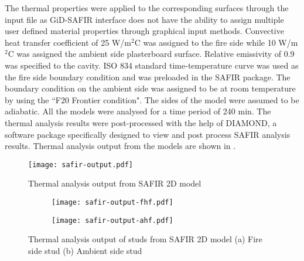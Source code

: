 The thermal properties were applied to the corresponding surfaces through the input file as GiD-SAFIR interface does not have the ability to assign multiple user defined material properties through graphical input methods. Convective heat transfer coefficient of 25 W/m$^2$\degree C was assigned to the fire side while 10 W/m$^2$\degree C was assigned the ambient side plasterboard surface. Relative emissivity of 0.9 was specified to the cavity. ISO 834 standard time-temperature curve was used as the fire side boundary condition and was preloaded in the SAFIR package. The boundary condition on the ambient side was assigned to be at room temperature by using the ``F20 Frontier condition". The sides of the model were assumed to be adiabatic. All the models were analysed for a time period of 240 min. The thermal analysis results were post-processed with the help of DIAMOND, a software package specifically designed to view and post process SAFIR analysis results. Thermal analysis output from the models are shown in .
\begin{figure}[!htbp]
	\centering
	\texttt{[image: safir-output.pdf]}
	\caption{Thermal analysis output from SAFIR 2D model}
	\label{fig:safir-output}
\end{figure}
\begin{figure}[!htbp]
	\centering
	\begin{subfigure}[b]{0.4\textwidth}
		\centering
		\texttt{[image: safir-output-fhf.pdf]}
		\caption{}
		\label{subfig:safir-output-fhf}
	\end{subfigure}
	\begin{subfigure}[b]{0.4\textwidth}
		\centering
		\texttt{[image: safir-output-ahf.pdf]}
		\caption{}
		\label{subfig:safir-output-ahf}
	\end{subfigure}
	   \caption{Thermal analysis output of studs from SAFIR 2D model (a) Fire side stud (b) Ambient side stud}
	   \label{fig:safir-output-studs}
\end{figure}

